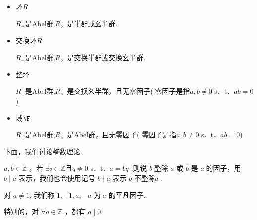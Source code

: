 \begin{definition}
\begin{itemize}
		
		
		\item 环$R$
		
		$R_{+}$是Abel群,$R_\times$ 是半群或幺半群.
		\item 交换环$R$
		
		$R_{+}$是Abel群,$R_\times
		$ 是交换半群或交换幺半群.
		\item 整环
		
		$R_{+}$是Abel群,$R_\times$ 是交换幺半群，且无零因子( 零因子是指$a, b \neq 0$ s．t．$a b=0$)
		\item 域$\F$
		
		$R_{+}$是Abel群,$R_\times$ 是Abel群，且无零因子( 零因子是指$a, b \neq 0$ s．t．$a b=0$)
	\end{itemize}
	
	
\end{definition}

下面，我们讨论整数理论.
\begin{definition}
	$a, b \in \mathbb{Z}$ ，若 $\exists q \in \mathbb{Z}\text{且}q\ne0$ s．t．$a=b q$  ,则说 $b$ 整除 $a$ 或 $b$ 是 $a$ 的因子，用 $b \mid a$ 表示，我们也会使用记号 $b \nmid a$ 表示 $b$ 不整除$a$ .
	
	对 $a \neq 1$, 我们称 $1,-1, a,-a$ 为 $a$ 的平凡因子.
	
	特别的，对 $\forall a \in \mathbb{Z}$ ，都有 $a\mid0$.
	
\end{definition}

